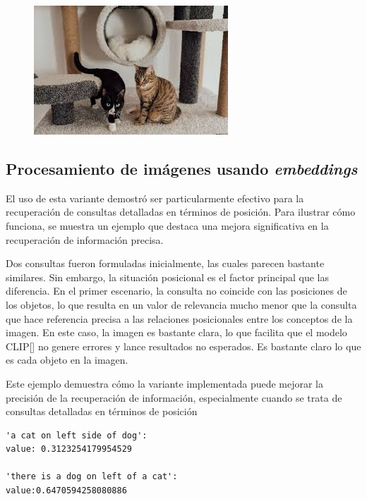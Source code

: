 \begin{figure}[H]
\begin{minipage}{0.3\textwidth}
 \includegraphics[width=\textwidth]{Graphics/Images/image_15.jpg}
 \caption{ }
 \label{fig:15}
\end{minipage}
\end{figure}

\subsection{Procesamiento de im\'agenes usando \textit{embeddings}}
El uso de esta variante demostró ser particularmente efectivo para la recuperación de consultas detalladas en términos de posición. Para ilustrar cómo funciona, se muestra un ejemplo que destaca una mejora significativa en la recuperación de información precisa.

Dos consultas fueron formuladas inicialmente, las cuales parecen bastante similares. Sin embargo, la situación posicional es el factor principal que las diferencia. En el primer escenario, la consulta no coincide con las posiciones de los objetos, lo que resulta en un valor de relevancia mucho menor que la consulta que hace referencia precisa a las relaciones posicionales entre los conceptos de la imagen. En este caso, la imagen es bastante clara, lo que facilita que el modelo CLIP[\cite{clip}] no genere errores y lance resultados no esperados. Es bastante claro lo que es cada objeto en la imagen.

Este ejemplo demuestra cómo la variante implementada puede mejorar la precisión de la recuperación de información, especialmente cuando se trata de consultas detalladas en términos de posición

\begin{verbatim}
'a cat on left side of dog':
value: 0.3123254179954529

'there is a dog on left of a cat':
value:0.6470594258080886
\end{verbatim}

